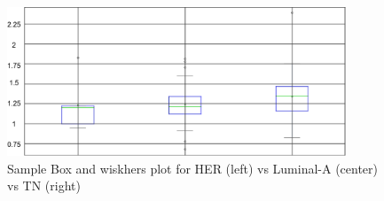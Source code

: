 \documentclass[final,1p,times,twocolumn]{elsarticle}
\begin{document}
\begin{figure}
\begin{minipage}{0.45\textwidth}
        \label{b3}
    \end{minipage}\hfill
    \begin{minipage}{0.45\textwidth}
        \centering
        \includegraphics[width=0.9\textwidth]{tg2.png} %
        \caption{Sample Box and wiskhers plot for HER (left) vs Luminal-A (center) vs TN (right)}
        \label{b4}
    \end{minipage}
\end{figure}


% 
% 
\end{document}
